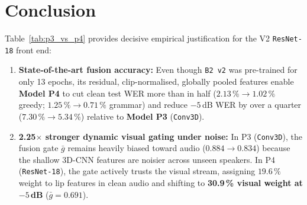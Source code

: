 \documentclass[11pt,a4paper]{article}
\newcommand{\code}[1]{\texttt{\small #1}}
\begin{document}
\section{Conclusion}
Table~\ref{tab:p3_vs_p4} provides decisive empirical justification for the V2 \code{ResNet-18} front end:
\begin{enumerate}
  \item \textbf{State-of-the-art fusion accuracy:} Even though \code{B2 v2} was pre-trained for only 13 epochs, its residual, clip-normalised, globally pooled features enable \textbf{Model P4} to cut clean test WER more than in half ($2.13\,\% \to 1.02\,\%$ greedy; $1.25\,\% \to 0.71\,\%$ grammar) and reduce $-5$\,dB WER by over a quarter ($7.30\,\% \to 5.34\,\%$) relative to \textbf{Model P3} (\code{Conv3D}).
  \item \textbf{2.25$\times$ stronger dynamic visual gating under noise:} In P3 (\code{Conv3D}), the fusion gate $\bar{g}$ remains heavily biased toward audio ($0.884 \to 0.834$) because the shallow 3D-CNN features are noisier across unseen speakers. In P4 (\code{ResNet-18}), the gate actively trusts the visual stream, assigning $19.6\,\%$ weight to lip features in clean audio and shifting to \textbf{30.9\,\% visual weight at $-5$\,dB} ($\bar{g}=0.691$).
\end{enumerate}
\end{document}
